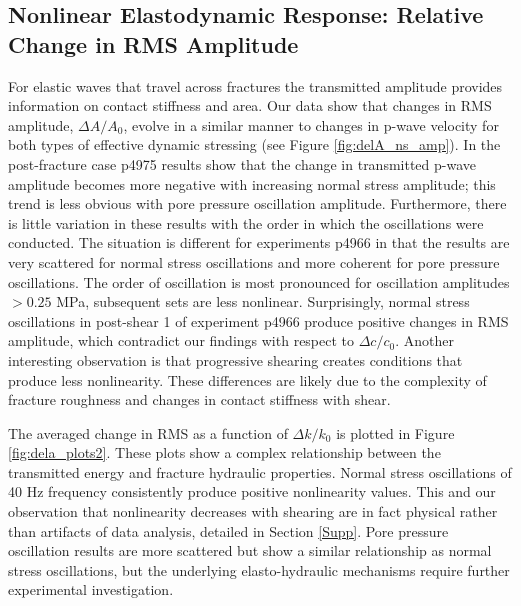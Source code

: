 \documentclass[letterpaper,10pt]{article}
\begin{document}
	\clearpage
	
	
	\subsection{Nonlinear Elastodynamic Response: Relative Change in RMS Amplitude}
	For elastic waves that travel across fractures the transmitted amplitude provides information on contact stiffness and area. Our data show that changes in RMS amplitude, $ \Delta A/ A_0 $, evolve in a similar manner to changes in p-wave velocity for both types of effective dynamic stressing (see Figure \ref{fig:delA_ns_amp}). In the post-fracture case p4975 results show that the change in transmitted p-wave amplitude becomes more negative with increasing normal stress amplitude; this trend is less obvious with pore pressure oscillation amplitude. Furthermore, there is little variation in these results with the order in which the oscillations were conducted. The situation is different for experiments p4966 in that the results are very scattered for normal stress oscillations and more coherent for pore pressure oscillations. The order of oscillation is most pronounced for oscillation amplitudes $ > 0.25 $ MPa, subsequent sets are less nonlinear. Surprisingly, normal stress oscillations in post-shear 1 of experiment p4966 produce positive changes in RMS amplitude, which contradict our findings with respect to $ \Delta c/c_0 $. Another interesting observation is that progressive shearing creates conditions that produce less nonlinearity. These differences are likely due to the complexity of fracture roughness and changes in contact stiffness with shear.
	
	The averaged change in RMS as a function of $ \Delta k/k_0 $ is plotted in Figure \ref{fig:dela_plots2}. These plots show a complex relationship between the transmitted energy and fracture hydraulic properties. Normal stress oscillations of 40 Hz frequency consistently produce positive nonlinearity values. This and our observation that nonlinearity decreases with shearing are in fact physical rather than artifacts of data analysis, detailed in Section \ref{Supp}. Pore pressure oscillation results are more scattered but show a similar relationship as normal stress oscillations, but the underlying elasto-hydraulic mechanisms require further experimental investigation.
	
	\clearpage
	
\end{document}
